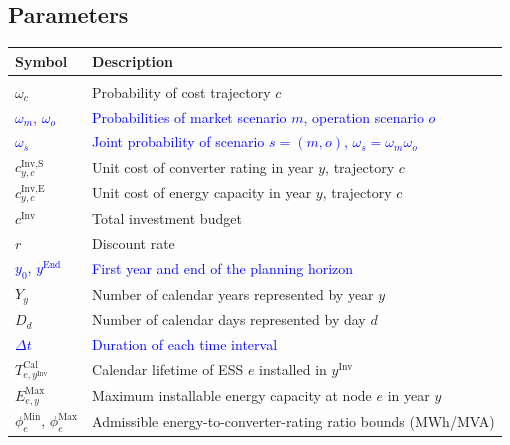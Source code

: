 \documentclass[preprint,12pt]{elsarticle}
\begin{document}
\subsection*{Parameters}

\begingroup
    \footnotesize
    \setlength{\LTpre}{0pt}
    \setlength{\LTpost}{0pt}
    \begin{longtable}{@{}>{\raggedright\arraybackslash}p{} >{\raggedright\arraybackslash}p{}@{}}
        \toprule
        \textbf{Symbol} & \textbf{Description} \\
        \midrule
        \endhead
        \midrule
        \endfoot
        \bottomrule
        \endlastfoot
        \multicolumn{2}{@{}l}{\textbf{Planning}}\\*
        $\omega_c$ & Probability of cost trajectory $c$ \\
        \textcolor{blue}{$\omega_m$, $\omega_o$} & \textcolor{blue}{Probabilities of market scenario $m$, operation scenario $o$} \\
        \textcolor{blue}{$\omega_s$} & \textcolor{blue}{Joint probability of scenario $s=(m,o)$, $\omega_s=\omega_m\omega_o$} \\
        $c^{\text{Inv,S}}_{y,c}$ & Unit cost of converter rating in year $y$, trajectory $c$ \\
        $c^{\text{Inv,E}}_{y,c}$ & Unit cost of energy capacity in year $y$, trajectory $c$ \\
        $c^{\text{Inv}}$ & Total investment budget \\
        $r$   & Discount rate \\
        \textcolor{blue}{$y_0$, $y^{\text{End}}$} & \textcolor{blue}{First year and end of the planning horizon} \\
        $Y_y$ & Number of calendar years represented by year $y$ \\
        $D_d$ & Number of calendar days represented by day $d$ \\
        \textcolor{blue}{$\Delta t$} & \textcolor{blue}{Duration of each time interval} \\
        $T^\text{Cal}_{e,y^{\text{Inv}}}$ & Calendar lifetime of ESS $e$ installed in $y^{\text{Inv}}$ \\
        $E^{\text{Max}}_{e,y}$ & Maximum installable energy capacity at node $e$ in year $y$ \\
        $\phi^{\text{Min}}_e$, $\phi^{\text{Max}}_e$ & Admissible energy-to-converter-rating ratio bounds (MWh/MVA) \\

\end{longtable}
\end{document}

